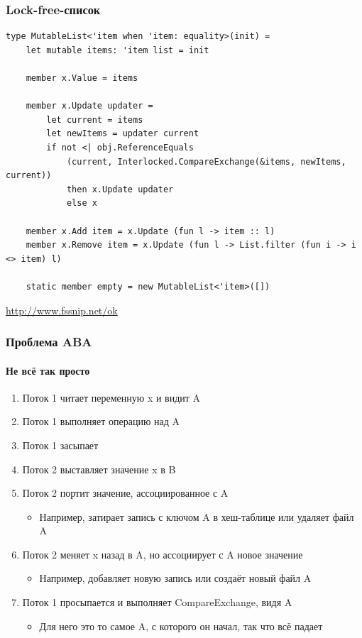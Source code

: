 \documentclass[xetex,mathserif,serif]{beamer}
\newcommand{\attribution}[1] {
    \begin{flushright}\begin{scriptsize}\textcolor{gray}{#1}\end{scriptsize}\end{flushright}
}
\begin{document}
    \begin{frame}[fragile]
        \frametitle{Lock-free-список}
        \begin{footnotesize}
            \begin{verbatim}
type MutableList<'item when 'item: equality>(init) =
    let mutable items: 'item list = init

    member x.Value = items

    member x.Update updater =
        let current = items
        let newItems = updater current
        if not <| obj.ReferenceEquals
            (current, Interlocked.CompareExchange(&items, newItems, current))
            then x.Update updater
            else x

    member x.Add item = x.Update (fun l -> item :: l)
    member x.Remove item = x.Update (fun l -> List.filter (fun i -> i <> item) l)

    static member empty = new MutableList<'item>([])
            \end{verbatim}
            \attribution{\url{http://www.fssnip.net/ok}}
        \end{footnotesize}
    \end{frame}

    \begin{frame}
        \frametitle{Проблема ABA}
        \framesubtitle{Не всё так просто}
        \begin{enumerate}
            \item Поток 1 читает переменную x и видит A
            \item Поток 1 выполняет операцию над A
            \item Поток 1 засыпает
            \item Поток 2 выставляет значение x в B
            \item Поток 2 портит значение, ассоциированное с A
            \begin{itemize}
                \item Например, затирает запись с ключом A в хеш-таблице или удаляет файл A
            \end{itemize}
            \item Поток 2 меняет x назад в A, но ассоциирует с A новое значение 
            \begin{itemize}
                \item Например, добавляет новую запись или создаёт новый файл A
            \end{itemize}
            \item Поток 1 просыпается и выполняет CompareExchange, видя A
            \begin{itemize}
                \item Для него это то самое A, с которого он начал, так что всё падает
            \end{itemize}
        \end{enumerate}
    \end{frame}
\end{document}
